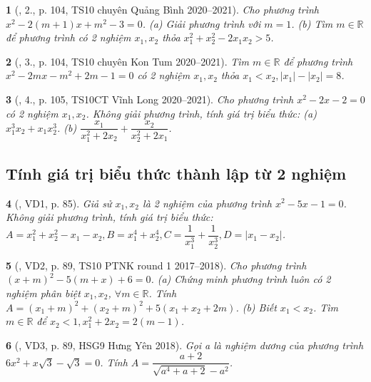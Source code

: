 \documentclass{article}
\newtheorem{baitoan}{}
\begin{document}
\begin{baitoan}[\cite{Lam_An_Tuan_Toan_9_dai_so}, 2., p. 104, TS10 chuyên Quảng Bình 2020--2021]
	Cho phương trình $x^2 - 2(m + 1)x + m^2 - 3 = 0$. (a) Giải phương trình với $m = 1$. (b) Tìm $m\in\mathbb{R}$ để phương trình có 2 nghiệm $x_1,x_2$ thỏa $x_1^2 + x_2^2 - 2x_1x_2 > 5$.
\end{baitoan}

\begin{baitoan}[\cite{Lam_An_Tuan_Toan_9_dai_so}, 3., p. 104, TS10 chuyên Kon Tum 2020--2021]
	Tìm $m\in\mathbb{R}$ để phương trình $x^2 - 2mx - m^2 + 2m - 1 = 0$ có 2 nghiệm $x_1,x_2$ thỏa $x_1 < x_2,|x_1| - |x_2| = 8$.
\end{baitoan}

\begin{baitoan}[\cite{Lam_An_Tuan_Toan_9_dai_so}, 4., p. 105, TS10CT Vĩnh Long 2020--2021]
	Cho phương trình $x^2 - 2x - 2 = 0$ có 2 nghiệm $x_1,x_2$. Không giải phương trình, tính giá trị biểu thức: (a) $x_1^3x_2 + x_1x_2^3$. (b) $\dfrac{x_1}{x_1^2 + 2x_2} + \dfrac{x_2}{x_2^2 + 2x_1}$.
\end{baitoan}

\subsection{Tính giá trị biểu thức thành lập từ 2 nghiệm}

\begin{baitoan}[\cite{Thu_Viet_Minh_ptb2}, VD1, p. 85]
	Giả sử $x_1,x_2$ là 2 nghiệm của phương trình $x^2 - 5x - 1 = 0$. Không giải phương trình, tính giá trị biểu thức: $A = x_1^2 + x_2^2 - x_1 - x_2,B = x_1^4 + x_2^4,C = \dfrac{1}{x_1^3} + \dfrac{1}{x_2^3},D = |x_1 - x_2|$.
\end{baitoan}

\begin{baitoan}[\cite{Thu_Viet_Minh_ptb2}, VD2, p. 89, TS10 PTNK round 1 2017--2018]
	Cho phương trình $(x + m)^2 - 5(m + x) + 6 = 0$. (a) Chứng minh phương trình luôn có 2 nghiệm phân biệt $x_1,x_2$, $\forall m\in\mathbb{R}$. Tính $A = (x_1 + m)^2 + (x_2 + m)^2 + 5(x_1 + x_2 + 2m)$. (b) Biết $x_1 < x_2$. Tìm $m\in\mathbb{R}$ để $x_2 < 1,x_1^2 + 2x_2 = 2(m - 1)$.
\end{baitoan}

\begin{baitoan}[\cite{Thu_Viet_Minh_ptb2}, VD3, p. 89, HSG9 Hưng Yên 2018]
	Gọi a là nghiệm dương của phương trình $6x^2 + x\sqrt{3} - \sqrt{3} = 0$. Tính $A = \dfrac{a + 2}{\sqrt{a^4 + a + 2} - a^2}$.
\end{baitoan}
\end{document}
